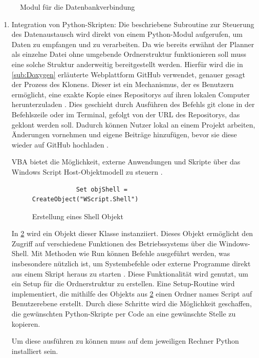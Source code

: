 \documentclass[11pt,a4paper]{report}
\begin{document}
\begin{figure}[H]
    \centerline{}
    \caption{Modul für die Datenbankverbindung}
    \label{fig:Database_modul}
\end{figure}

\begin{enumerate}\addtocounter{enumi}{2}
     \item Integration von Python-Skripten: Die beschriebene Subroutine zur Steuerung des Datenaustausch wird direkt von einem Python-Modul aufgerufen, um Daten zu empfangen und zu verarbeiten. Da wie bereits erwähnt der Planner als einzelne Datei ohne umgebende Ordnerstruktur funktionieren soll muss eine solche Struktur anderweitig bereitgestellt werden. Hierfür wird die in \ref{sub:Doxygen} erläuterte Webplattform GitHub verwendet, genauer gesagt der Prozess des Klonens. Dieser ist ein Mechanismus, der es Benutzern ermöglicht, eine exakte Kopie eines Repositorys auf ihren lokalen Computer herunterzuladen \cite{git_clone}. Dies geschieht durch Ausführen des Befehls \glqq git clone \grqq{} in der Befehlszeile oder im Terminal, gefolgt von der URL des Repositorys, das geklont werden soll.
    Dadurch können Nutzer lokal an einem Projekt arbeiten, Änderungen vornehmen und eigene Beiträge hinzufügen, bevor sie diese wieder auf GitHub hochladen \cite{git_clone}.

    \noindent
    VBA bietet die Möglichkeit, externe Anwendungen und Skripte über das Windows Script Host-Objektmodell zu steuern \cite{shell_objekt}. 
    \begin{figure}[H]
        \centering
        \begin{verbatim}
            Set objShell = CreateObject("WScript.Shell")
        \end{verbatim}
    \caption{Erstellung eines Shell Objekt}
    \label{code:WScript.shell}
    \end{figure}

    \noindent
    In \ref{code:WScript.shell} wird ein Objekt dieser Klasse instanziiert. Dieses Objekt ermöglicht den Zugriff auf verschiedene Funktionen des Betriebssystems über die Windows-Shell. Mit Methoden wie \glqq Run \grqq{} können Befehle ausgeführt werden, was insbesondere nützlich ist, um Systembefehle oder externe Programme direkt aus einem Skript heraus zu starten \cite{shell_objekt}. Diese Funktionalität wird genutzt, um ein Setup für die Ordnerstruktur zu erstellen. Eine Setup-Routine wird implementiert, die mithilfe des Objekts aus \ref{code:WScript.shell} einen Ordner names \glqq Script \grqq{} auf Benutzerebene erstellt. Durch diese Schritte wird die Möglichkeit geschaffen, die gewünschten Python-Skripte per Code an eine gewünschte Stelle zu kopieren.

    \noindent
    Um diese ausführen zu können muss auf dem jeweiligen Rechner Python installiert sein.
  \end{enumerate}
\end{document}

